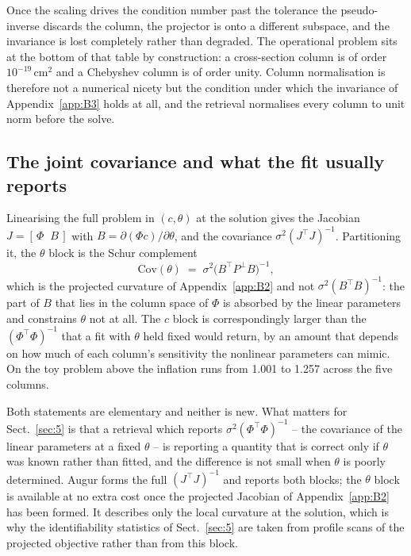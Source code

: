 Once the scaling drives the condition number past the tolerance the
pseudo-inverse discards the column, the projector is onto a different
subspace, and the invariance is lost completely rather than degraded. The
operational problem sits at the bottom of that table by construction: a
cross-section column is of order $10^{-19}$\,cm$^2$ and a Chebyshev column is
of order unity. Column normalisation is therefore not a numerical nicety but
the condition under which the invariance of Appendix~\ref{app:B3} holds at all, and the
retrieval normalises every column to unit norm before the solve.

\subsection{The joint covariance and what the fit usually reports}
\label{app:B4}

Linearising the full problem in $(c,\theta)$ at the solution gives the
Jacobian $J = [\,\Phi \;\; B\,]$ with
$B = \partial(\Phi c)/\partial\theta$, and the covariance
$\sigma^{2}(J^{\top}J)^{-1}$. Partitioning it, the $\theta$ block is the
Schur complement
\begin{equation*}
\mathrm{Cov}(\theta) \;=\; \sigma^{2}\bigl(B^{\top}P^{\perp}B\bigr)^{-1},
\end{equation*}
which is the projected curvature of Appendix~\ref{app:B2} and not $\sigma^2(B^\top B)^{-1}$: the
part of $B$ that lies in the column space of $\Phi$ is absorbed by the linear
parameters and constrains $\theta$ not at all. The $c$ block is correspondingly
larger than the $(\Phi^{\top}\Phi)^{-1}$ that a fit with $\theta$ held fixed
would return, by an amount that depends on how much of each column's
sensitivity the nonlinear parameters can mimic. On the toy problem above the
inflation runs from 1.001 to 1.257 across the five columns.

Both statements are elementary and neither is new. What matters for Sect.~\ref{sec:5} is that
a retrieval which reports $\sigma^2(\Phi^{\top}\Phi)^{-1}$ -- the covariance of
the linear parameters at a fixed $\theta$ -- is reporting a quantity that is
correct only if $\theta$ was known rather than fitted, and the difference is
not small when $\theta$ is poorly determined. Augur forms the full
$(J^{\top}J)^{-1}$ and reports both blocks; the $\theta$ block is available at no extra cost once
the projected Jacobian of Appendix~\ref{app:B2} has been formed. It describes only the local curvature at the
solution, which is why the identifiability statistics of Sect.~\ref{sec:5} are taken from profile scans of the
projected objective rather than from this block.

